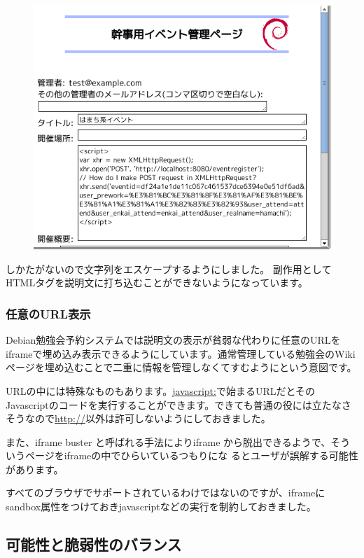 \documentclass[mingoth,a4paper]{jsarticle}
\begin{document}
\begin{figure}\includegraphics[width=\hsize]{image201201/xhr.png}\end{figure}

しかたがないので文字列をエスケープするようにしました。
副作用としてHTMLタグを説明文に打ち込むことができないようになっています。

\subsubsection{任意のURL表示}

Debian勉強会予約システムでは説明文の表示が貧弱な代わりに任意のURLを
iframeで埋め込み表示できるようにしています。通常管理している勉強会のWiki
ページを埋め込むことで二重に情報を管理しなくてすむようにという意図です。

URLの中には特殊なものもあります。\url{javascript:}で始まるURLだとその
Javascriptのコードを実行することができます。できても普通の役には立たなさ
そうなので\url{http://}以外は許可しないようにしておきました。

また、iframe buster と呼ばれる手法によりiframe
から脱出できるようで、そういうページをiframeの中でひらいているつもりにな
るとユーザが誤解する可能性があります。

すべてのブラウザでサポートされているわけではないのですが、iframeに
sandbox属性をつけておきjavascriptなどの実行を制約しておきました。

\subsection{可能性と脆弱性のバランス}
\end{document}
